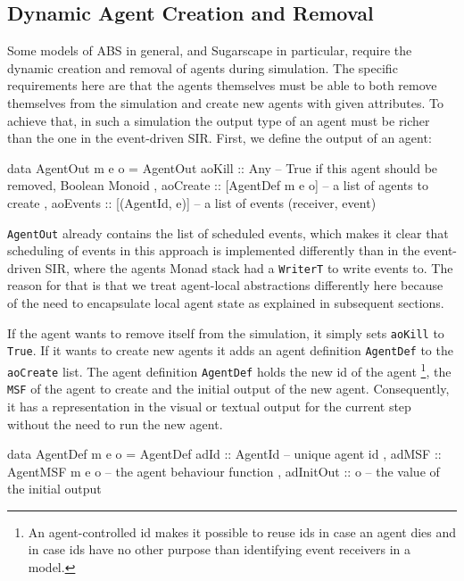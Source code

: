 \subsection{Dynamic Agent Creation and Removal}
\label{sec:dynamic_creationremoval}
Some models of ABS in general, and Sugarscape in particular, require the dynamic creation and removal of agents during simulation. The specific requirements here are that the agents themselves must be able to both remove themselves from the simulation and create new agents with given attributes. To achieve that, in such a simulation the output type of an agent must be richer than the one in the event-driven SIR. First, we define the output of an agent:

\begin{HaskellCode}
data AgentOut m e o = AgentOut
  { aoKill   :: Any  -- True if this agent should be removed, Boolean Monoid
  , aoCreate :: [AgentDef m e o] -- a list of agents to create
  , aoEvents :: [(AgentId, e)]   -- a list of events (receiver, event)
  }
\end{HaskellCode}

\texttt{AgentOut} already contains the list of scheduled events, which makes it clear that scheduling of events in this approach is implemented differently than in the event-driven SIR, where the agents Monad stack had a \texttt{WriterT} to write events to. The reason for that is that we treat agent-local abstractions differently here because of the need to encapsulate local agent state as explained in subsequent sections.

If the agent wants to remove itself from the simulation, it simply sets \texttt{aoKill} to \texttt{True}. If it wants to create new agents it adds an agent definition \texttt{AgentDef} to the \texttt{aoCreate} list. The agent definition \texttt{AgentDef} holds the new id of the agent \footnote{An agent-controlled id makes it possible to reuse ids in case an agent dies and in case ids have no other purpose than identifying event receivers in a model.}, the \texttt{MSF} of the agent to create and the initial output of the new agent. Consequently, it has a representation in the visual or textual output for the current step without the need to run the new agent.

\begin{HaskellCode}
data AgentDef m e o = AgentDef
  { adId      :: AgentId         -- unique agent id
  , adMSF     :: AgentMSF m e o  -- the agent behaviour function
  , adInitOut :: o               -- the value of the initial output
  }
\end{HaskellCode}


